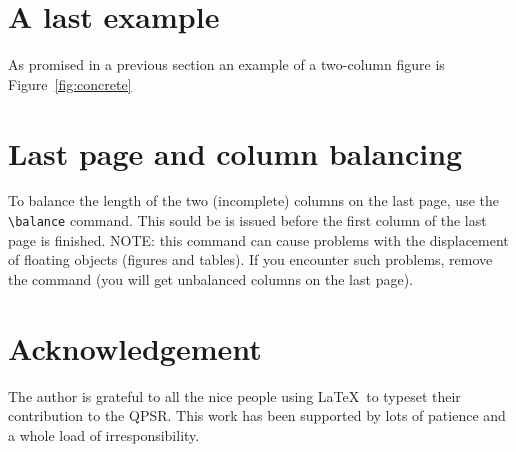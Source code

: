 \documentclass[a4paper,twoside,10pt]{fonetik}
\begin{document}
\section{A last example}
As promised in a previous section an example of a
two-column figure is Figure~\ref{fig:concrete}

\section{Last page and column balancing}
To balance the length of the two (incomplete) columns on the last
page, use the \verb|\balance| command. This sould be is issued before
the first column of the last page is finished. NOTE: this command can
cause problems with the displacement of floating objects (figures and
tables). If you encounter such problems, remove the command (you will
get unbalanced columns on the last page).
\balance


\section{Acknowledgement}
The author is grateful to all the nice people using \LaTeX\ to typeset
their contribution to the QPSR. This work has been supported by lots
of patience and a whole load of irresponsibility.




\end{document}
